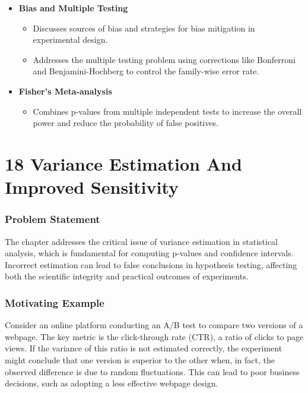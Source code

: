 \documentclass{article}
\begin{document}
\begin{itemize}
    \item \textbf{Bias and Multiple Testing}
    \begin{itemize}
        \item Discusses sources of bias and strategies for bias mitigation in experimental design.
        \item Addresses the multiple testing problem using corrections like Bonferroni and Benjamini-Hochberg to control the family-wise error rate.
    \end{itemize}

    \item \textbf{Fisher's Meta-analysis}
    \begin{itemize}
        \item Combines p-values from multiple independent tests to increase the overall power and reduce the probability of false positives.
    \end{itemize}
\end{itemize}

\section*{18 Variance Estimation And Improved Sensitivity}
\subsubsection*{Problem Statement}
The chapter addresses the critical issue of variance estimation in statistical analysis, which is fundamental for computing p-values and confidence intervals. Incorrect estimation can lead to false conclusions in hypothesis testing, affecting both the scientific integrity and practical outcomes of experiments.

\subsubsection*{Motivating Example}
Consider an online platform conducting an A/B test to compare two versions of a webpage. The key metric is the click-through rate (CTR), a ratio of clicks to page views. If the variance of this ratio is not estimated correctly, the experiment might conclude that one version is superior to the other when, in fact, the observed difference is due to random fluctuations. This can lead to poor business decisions, such as adopting a less effective webpage design.
\end{document}
